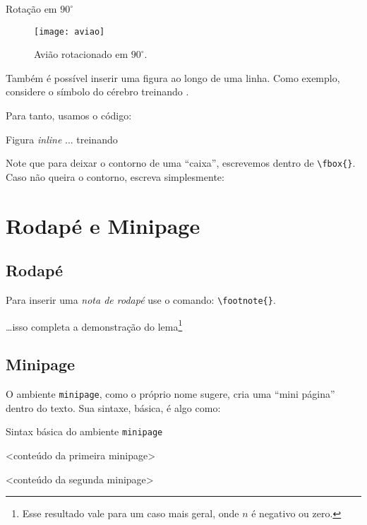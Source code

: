 \begin{codigo}{Rotação em $90^{\circ}$}{\lapis}
\begin{figure}[!htbp]
\centering
\texttt{[image: aviao]}
\caption{Avião rotacionado em $90^{\circ}$.}
\label{fig:avi3}
\end{figure}
\end{codigo}

Também é possível inserir uma figura ao longo de uma linha.
Como exemplo, considere o símbolo do cérebro treinando .

Para tanto, usamos o código:

\begin{codigo}{Figura \textit{inline}}{\lapis}
... treinando 
\end{codigo}

Note que para deixar o contorno de uma ``caixa'', escrevemos dentro de 
\Verb|\fbox{}|.
Caso não queira o contorno, escreva simplesmente:


%
  \section{Rodapé e Minipage} %
  \label{sec:pemini}
%
%
  \subsection{Rodapé}
%
Para inserir uma \textit{nota de rodapé} use o comando: \Verb|\footnote{}|.

\begin{tcblisting}{}
\ldots isso completa a demonstração do lema\footnote{Esse resultado vale para 
um caso mais geral, onde $n$ é negativo ou zero.}
\end{tcblisting}

%
  \subsection{Minipage}
%

O ambiente \texttt{minipage}, como o próprio nome sugere, cria uma ``mini página'' 
dentro do texto.
Sua sintaxe, básica, é algo como:

\begin{codigo}{Sintax básica do ambiente \texttt{minipage}}{\lapis}
\begin{minipage}[posição]{comprimento_1}
  <conteúdo da primeira minipage>
\end{minipage}
\hfill
\begin{minipage}[posição]{comprimento_2}
  <conteúdo da segunda minipage>
\end{minipage}
\end{codigo}

